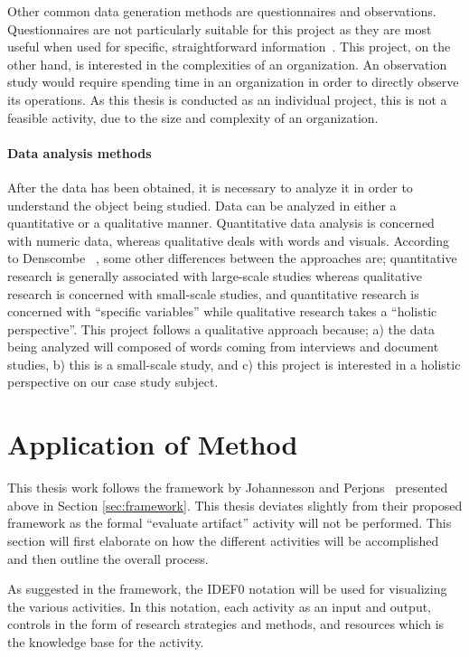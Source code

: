 Other common data generation methods are questionnaires and observations. Questionnaires are not particularly suitable for this project as they are most useful when used for specific, straightforward information~\cite{denscombe2010good}. This project, on the other hand, is interested in the complexities of an organization. An observation study would require spending time in an organization in order to directly observe its operations. As this thesis is conducted as an individual project, this is not a feasible activity, due to the size and complexity of an organization.

\paragraph*{Data analysis methods}

After the data has been obtained, it is necessary to analyze it in order to understand the object being studied. Data can be analyzed in either a quantitative or a qualitative manner. Quantitative data analysis is concerned with numeric data, whereas qualitative deals with words and visuals. According to Denscombe ~\cite{denscombe2010good}, some other differences between the approaches are; quantitative research is generally associated with large-scale studies whereas qualitative research is concerned with small-scale studies, and quantitative research is concerned with ``specific variables'' while qualitative research takes a ``holistic perspective''. This project follows a qualitative approach because; a) the data being analyzed will composed of words coming from interviews and document studies, b) this is a small-scale study, and c) this project is interested in a holistic perspective on our case study subject.

\section{Application of Method}

This thesis work follows the framework by Johannesson and Perjons~\cite[Ch. 4]{johannessonPerjons2012} presented above in Section \ref{sec:framework}. This thesis deviates slightly from their proposed framework as the formal ``evaluate artifact'' activity will not be performed. This section will first elaborate on how the different activities will be accomplished and then outline the overall process. 

As suggested in the framework, the IDEF0 notation will be used for visualizing the various activities. In this notation, each activity as an input and output, controls in the form of research strategies and methods, and resources which is the knowledge base for the activity.

